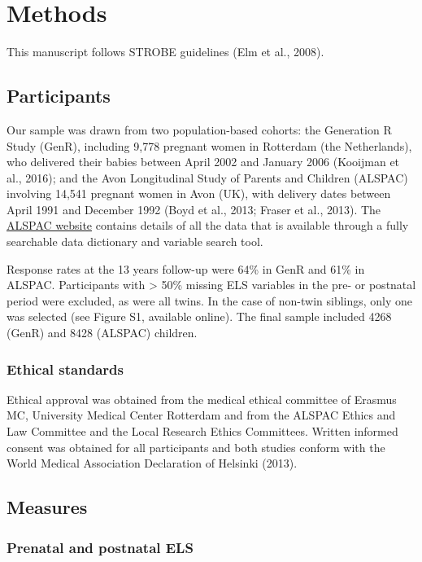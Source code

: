 \documentclass[
  letterpaper,
  DIV=11,
  numbers=noendperiod]{scrreport}
\begin{document}
\section{Methods}\label{methods}

This manuscript follows STROBE guidelines (Elm et al., 2008).

\subsection{Participants}\label{participants}

Our sample was drawn from two population-based cohorts: the Generation R
Study (GenR), including 9,778 pregnant women in Rotterdam (the
Netherlands), who delivered their babies between April 2002 and January
2006 (Kooijman et al., 2016); and the Avon Longitudinal Study of Parents
and Children (ALSPAC) involving 14,541 pregnant women in Avon (UK), with
delivery dates between April 1991 and December 1992 (Boyd et al., 2013;
Fraser et al., 2013). The
\href{http://www.bristol.ac.uk/alspac/researchers/our-data/}{ALSPAC
website} contains details of all the data that is available through a
fully searchable data dictionary and variable search tool.

Response rates at the 13 years follow-up were 64\% in GenR and 61\% in
ALSPAC. Participants with \textgreater{} 50\% missing ELS variables in
the pre- or postnatal period were excluded, as were all twins. In the
case of non-twin siblings, only one was selected (see Figure S1,
available online). The final sample included 4268 (GenR) and 8428
(ALSPAC) children.

\subsubsection{Ethical standards}\label{ethical-standards}

Ethical approval was obtained from the medical ethical committee of
Erasmus MC, University Medical Center Rotterdam and from the ALSPAC
Ethics and Law Committee and the Local Research Ethics Committees.
Written informed consent was obtained for all participants and both
studies conform with the World Medical Association Declaration of
Helsinki (2013).

\subsection{Measures}\label{measures}

\subsubsection{Prenatal and postnatal
ELS}\label{prenatal-and-postnatal-els}
\end{document}
